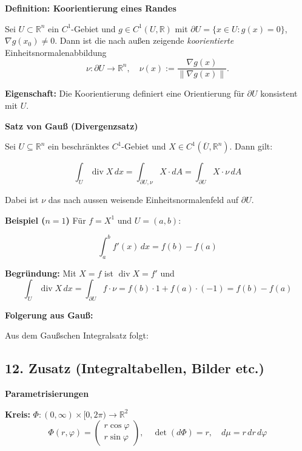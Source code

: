 \textbf{Definition: Koorientierung eines Randes}

Sei $U \subset \mathbb{R}^n$ ein $C^1$-Gebiet und $g \in C^1(U, \mathbb{R})$ mit $\partial U = \{x \in U : g(x) = 0\}$, $\nabla g(x_0) \neq 0$.  
Dann ist die nach außen zeigende \textit{koorientierte} Einheitsnormalenabbildung
\[
\nu: \partial U \to \mathbb{R}^n, \quad \nu(x) := \frac{\nabla g(x)}{\|\nabla g(x)\|}.
\]

\textbf{Eigenschaft:}  
Die Koorientierung definiert eine Orientierung für $\partial U$ konsistent mit $U$.

\textbf{Satz von Gauß (Divergenzsatz)}

Sei $U \subseteq \mathbb{R}^n$ ein beschränktes $C^1$-Gebiet und $X \in C^1(\overline{U}, \mathbb{R}^n)$. Dann gilt:

\[
\int_U \operatorname{div} X \, dx = \int_{\partial U, \nu} X \cdot dA = \int_{\partial U} X \cdot \nu \, dA
\]

Dabei ist $\nu$ das nach aussen weisende Einheitsnormalenfeld auf $\partial U$.

\textbf{Beispiel ($n=1$)}
Für $f = X^1$ und $U = (a,b)$:

\[
\int_a^b f'(x)\, dx = f(b) - f(a)
\]

\textbf{Begründung:} Mit $X = f$ ist $\operatorname{div} X = f'$ und
\[
\int_U \operatorname{div} X \, dx = \int_{\partial U} f \cdot \nu = f(b)\cdot 1 + f(a)\cdot (-1) = f(b) - f(a)
\]

\textbf{Folgerung aus Gauß:}

Aus dem Gaußschen Integralsatz folgt:


\subsection{12. Zusatz (Integraltabellen, Bilder etc.)}


\textbf{Parametrisierungen}

\vspace{0.5em}

\textbf{Kreis:} $\Phi : (0, \infty) \times [0, 2\pi) \to \mathbb{R}^2$
\[
\Phi(r, \varphi) = \begin{pmatrix} r\cos\varphi \\ r\sin\varphi \end{pmatrix}, \quad
\det(d\Phi) = r, \quad
d\mu = r\,dr\,d\varphi
\]

